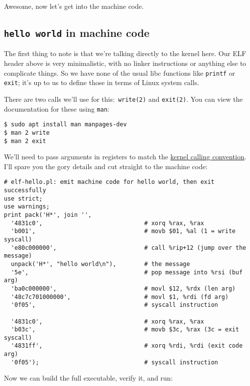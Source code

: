 \documentclass{article}
\newcommand{\lnk}[2]{\href{#1}{\textcolor[rgb]{1.0,0.0,0.0}{#2}}}
\begin{document}
  Awesome, now let's get into the machine code.

  \subsection{{\tt hello world} in machine code}
  The first thing to note is that we're talking directly to the kernel here. Our
  ELF header above is very minimalistic, with no linker instructions or anything
  else to complicate things. So we have none of the usual libc functions like
  {\tt printf} or {\tt exit}; it's up to us to define those in terms of Linux
  system calls.

  There are two calls we'll use for this:~{\tt write(2)} and {\tt exit(2)}. You
  can view the documentation for these using {\tt man}:

  \begin{verbatim}
$ sudo apt install man manpages-dev
$ man 2 write
$ man 2 exit\end{verbatim}

  We'll need to pass arguments in registers to match the
  \lnk{https://stackoverflow.com/questions/2535989/what-are-the-calling-conventions-for-unix-linux-system-calls-on-i386-and-x86-6}
      {kernel calling convention}. I'll spare you the gory details and cut
  straight to the machine code:

  \begin{verbatim}
# elf-hello.pl: emit machine code for hello world, then exit successfully
use strict;
use warnings;
print pack('H*', join '',
  '4831c0',                             # xorq %rax, %rax
  'b001',                               # movb $01, %al (1 = write syscall)
  'e80c000000',                         # call %rip+12 (jump over the message)
  unpack('H*', "hello world\n"),        # the message
  '5e',                                 # pop message into %rsi (buf arg)
  'ba0c000000',                         # movl $12, %rdx (len arg)
  '48c7c701000000',                     # movl $1, %rdi (fd arg)
  '0f05',                               # syscall instruction

  '4831c0',                             # xorq %rax, %rax
  'b03c',                               # movb $3c, %rax (3c = exit syscall)
  '4831ff',                             # xorq %rdi, %rdi (exit code arg)
  '0f05');                              # syscall instruction\end{verbatim}

  Now we can build the full executable, verify it, and run:
\end{document}
